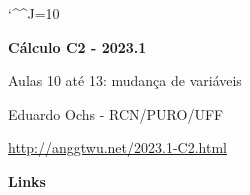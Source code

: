 \documentclass[oneside,12pt]{article}
\begin{document}

\def\drafturl{http://anggtwu.net/LATEX/2023-1-C2.pdf}
\def\drafturl{http://anggtwu.net/2023.1-C2.html}
\def\draftfooter{\tiny \href{\drafturl}{\jobname{}} \ColorBrown{\shorttoday{} \hours}}


\catcode`\^^J=10

\def\Caurl   #1{\expr{Caurl("#1")}}
\def\Cahref#1#2{\href{\Caurl{#1}}{#2}}
\def\Ca      #1{\Cahref{#1}{#1}}
\pu

\def\eqnpfull#1{\overset{\scriptscriptstyle(#1)}{=}}
\def\eqnpbare#1{=}
\def\eqnp      {\eqnpfull}

\def\redname#1{{\color{Red3}\text{#1}}}
\sa{II}{\redname{[II]}}
\sa{MVI}{\redname{[MVI]}}




%

\thispagestyle{empty}

\begin{center}

\vspace*{1.2cm}

{\bf \Large Cálculo C2 - 2023.1}

\bsk

Aulas 10 até 13: mudança de variáveis

\bsk

Eduardo Ochs - RCN/PURO/UFF

\url{http://anggtwu.net/2023.1-C2.html}

\end{center}

\newpage


{\bf Links}
\end{document}
